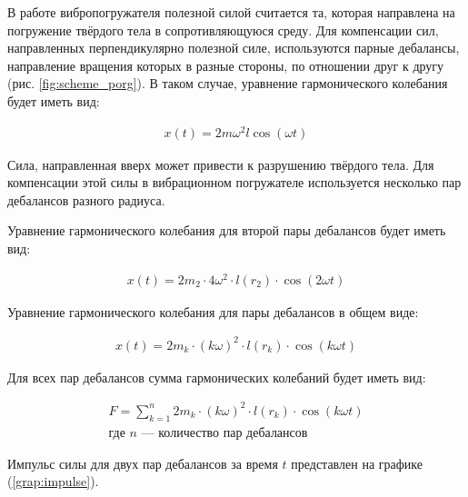 В работе вибропогружателя полезной силой считается та, которая направлена на погружение твёрдого тела в сопротивляющуюся среду. Для компенсации сил, направленных перпендикулярно полезной силе, используются парные дебалансы, направление вращения которых в разные стороны, по отношении друг к другу (рис. \ref{fig:scheme_porg}). В таком случае, уравнение гармонического колебания будет иметь вид:

\begin{equation}\label{eq:harmonic_dual}
    \begin{aligned}
        x(t) = 2 m \omega^2 l \cos (\omega t)
    \end{aligned}
\end{equation}

Сила, направленная вверх может привести к разрушению твёрдого тела. Для компенсации этой силы в вибрационном погружателе используется несколько пар дебалансов разного радиуса.

Уравнение гармонического колебания для второй пары дебалансов будет иметь вид:

\begin{equation*}
    \begin{aligned}
        x(t) = 2 m_2 \cdot 4 \omega^2 \cdot l(r_2) \cdot \cos (2 \omega t)
    \end{aligned}
\end{equation*}

Уравнение гармонического колебания для пары дебалансов в общем виде:

\begin{equation}\label{eq:harmonic_common}
    \begin{aligned}
        x(t) = 2 m_k \cdot (k \omega)^2 \cdot l(r_k) \cdot \cos (k \omega t)
    \end{aligned}
\end{equation}

Для всех пар дебалансов сумма гармонических колебаний будет иметь вид:

\begin{equation}\label{eq:harmonic_sum}
    \begin{gathered}
        F = \sum_{k = 1}^{n} 2 m_k \cdot (k \omega)^2 \cdot l(r_k) \cdot \cos (k \omega t) \\
        \textrm{где $n$ --- количество пар дебалансов} 
    \end{gathered}
\end{equation}

Импульс силы для двух пар дебалансов за время $t$ представлен на графике (\ref{grap:impulse}).

